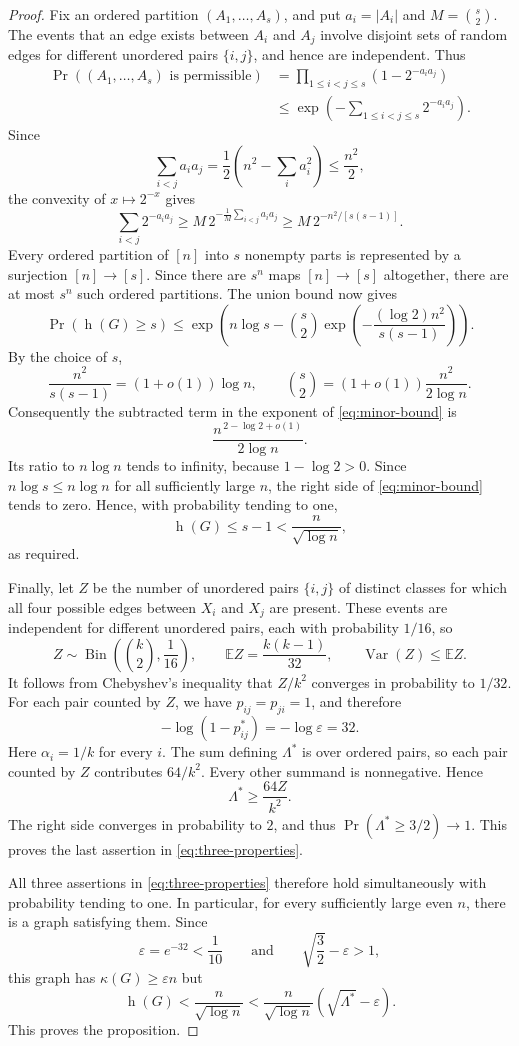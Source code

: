 \documentclass[11pt]{article}
\DeclareMathOperator{\had}{h}
\newcommand{\eps}{\varepsilon}
\begin{document}
\begin{proof}
Fix an ordered partition $(A_1,\dots,A_s)$, and put $a_i=|A_i|$ and $M=\binom{s}{2}$. The events that an edge exists between $A_i$ and $A_j$ involve disjoint sets of random edges for different unordered pairs $\{i,j\}$, and hence are independent. Thus
\begin{align*}
 \Pr((A_1,\dots,A_s)\text{ is permissible})
 &=\prod_{1\le i<j\le s}(1-2^{-a_i a_j})\\
 &\le\exp\left(-\sum_{1\le i<j\le s}2^{-a_i a_j}\right).
\end{align*}
Since
\[
 \sum_{i<j}a_i a_j
 =\frac12\left(n^2-\sum_i a_i^2\right)
 \le\frac{n^2}{2},
\]
the convexity of $x\mapsto2^{-x}$ gives
\[
 \sum_{i<j}2^{-a_i a_j}
 \ge M\,2^{-\frac1M\sum_{i<j}a_i a_j}
 \ge M\,2^{-n^2/[s(s-1)]}.
\]
Every ordered partition of $[n]$ into $s$ nonempty parts is represented by a surjection $[n]\to[s]$. Since there are $s^n$ maps $[n]\to[s]$ altogether, there are at most $s^n$ such ordered partitions. The union bound now gives
\begin{equation}\label{eq:minor-bound}
 \Pr(\had(G)\ge s)
 \le
 \exp\left(
 n\log s-\binom{s}{2}
 \exp\left(-\frac{(\log 2)n^2}{s(s-1)}\right)
 \right).
\end{equation}
By the choice of $s$,
\[
 \frac{n^2}{s(s-1)}=(1+o(1))\log n,
 \qquad
 \binom{s}{2}=(1+o(1))\frac{n^2}{2\log n}.
\]
Consequently the subtracted term in the exponent of \eqref{eq:minor-bound} is
\[
 \frac{n^{\,2-\log 2+o(1)}}{2\log n}.
\]
Its ratio to $n\log n$ tends to infinity, because $1-\log 2>0$. Since $n\log s\le n\log n$ for all sufficiently large $n$, the right side of \eqref{eq:minor-bound} tends to zero. Hence, with probability tending to one,
\[
 \had(G)\le s-1<\frac n{\sqrt{\log n}},
\]
as required.

Finally, let $Z$ be the number of unordered pairs $\{i,j\}$ of distinct classes for which all four possible edges between $X_i$ and $X_j$ are present. These events are independent for different unordered pairs, each with probability $1/16$, so
\[
 Z\sim\operatorname{Bin}\left(\binom{k}{2},\frac1{16}\right),
 \qquad
 \mathbb E Z=\frac{k(k-1)}{32},
 \qquad
 \operatorname{Var}(Z)\le\mathbb E Z.
\]
It follows from Chebyshev's inequality that $Z/k^2$ converges in probability to $1/32$. For each pair counted by $Z$, we have $p_{ij}=p_{ji}=1$, and therefore
\[
 -\log(1-p_{ij}^*)=-\log\eps=32.
\]
Here $\alpha_i=1/k$ for every $i$. The sum defining $\Lambda^*$ is over ordered pairs, so each pair counted by $Z$ contributes $64/k^2$. Every other summand is nonnegative. Hence
\[
 \Lambda^*\ge\frac{64Z}{k^2}.
\]
The right side converges in probability to $2$, and thus $\Pr(\Lambda^*\ge3/2)\to1$. This proves the last assertion in \eqref{eq:three-properties}.

All three assertions in \eqref{eq:three-properties} therefore hold simultaneously with probability tending to one. In particular, for every sufficiently large even $n$, there is a graph satisfying them. Since
\[
 \eps=e^{-32}<\frac1{10}
 \qquad\text{and}\qquad
 \sqrt{\frac32}-\eps>1,
\]
this graph has $\kappa(G)\ge\eps n$ but
\[
 \had(G)
 <\frac n{\sqrt{\log n}}
 <\frac n{\sqrt{\log n}}\left(\sqrt{\Lambda^*}-\eps\right).
\]
This proves the proposition.
\end{proof}
\end{document}
